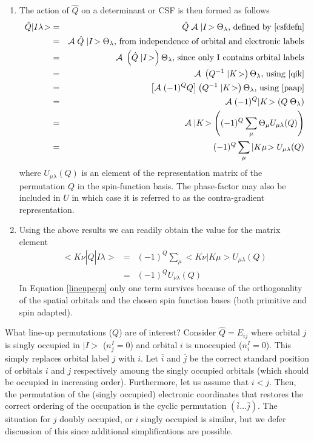 \begin{enumerate}
\item The action of $\hat{Q}$ on a determinant or CSF is then formed
as follows
\begin{eqnarray}
  \hat{Q} |I \lambda\! > 
  & = & \hat{Q} \; {\cal A} \; |I\! > \Theta_{\lambda} \mbox{, defined
by \ref{csfdefn}} \\
  & = & {\cal A} \; \hat{Q} \; |I\! > \Theta_{\lambda} \mbox{, from
independence of orbital and electronic labels} \\
  & = & {\cal A} \; \left( \hat{Q} \; |I\! > \right) \Theta_{\lambda}
\mbox{, since only I contains orbital labels} \\
  & = & {\cal A} \; \left( Q^{-1} \; |K\! > \right) \Theta_{\lambda} 
\mbox{, using \ref{qik}} \\
  & = & \left[ {\cal A} \; (-1)^Q Q \right]  \left( Q^{-1} \; |K\! >
\right) \Theta_{\lambda} \mbox{, using \ref{paap}} \\
  & = & {\cal A} \; (- 1)^Q |K\! > \left( Q \; \Theta_{\lambda} \right) 
 \\
  & = & {\cal A} \; |K\! > \left(  (- 1)^Q  \sum_{\mu} \Theta_{\mu}
U_{\mu \lambda}(Q) \right)  \\
  & = & (-1)^Q \sum_{\mu} |K \mu\! > U_{\mu \lambda}(Q)
\end{eqnarray}
where $U_{\mu \lambda}(Q)$ is an element of the representation matrix
of the permutation $Q$ in the spin-function basis.  The phase-factor
may also be included in $U$ in which case it is referred to as the
contra-gradient representation.

\item Using the above results we can readily obtain the value for the
matrix element
\begin{eqnarray}
 <\! K\nu | \hat{Q} | I \lambda\! > & = & (-1)^Q \sum_{\mu}
  <\! K \nu | K \mu \! > U_{\mu \lambda}(Q) \label{lineupeqn} \\
  & = & (-1)^Q U_{\nu \lambda}(Q) 
\end{eqnarray}
In Equation \ref{lineupeqn} only one term survives because of the
orthogonality of the spatial orbitals and the chosen spin function
bases (both primitive and spin adapted).
\end{enumerate}

What line-up permutations ($Q$) are of interest?  Consider $\hat{Q} =
E_{ij}$ where orbital $j$ is singly occupied in $|I\! >$ ($n_j^I = 0$)
and orbital $i$ is unoccupied ($n_i^I=0$).  This simply replaces
orbital label $j$ with $i$.  Let $\overline{i}$ and $\overline{j}$ be
the correct standard position of orbitals $i$ and $j$ respectively
amoung the singly occupied orbitals (which should be occupied in
increasing order).  Furthermore, let us assume that $i < j$.  Then,
the permutation of the (singly occupied) electronic coordinates that
restores the correct ordering of the occupation is the cyclic
permutation $(\overline{i} \ldots \overline{j})$.  The situation for
$j$ doubly occupied, or $i$ singly occupied is similar, but we defer
discussion of this since additional simplifications are possible.

